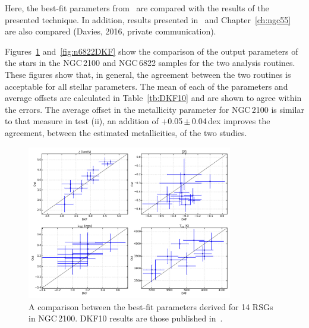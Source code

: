 Here, the best-fit parameters from~\cite{2015ApJ...803...14P} are compared with the results of the presented technique.
In addition, results presented in~\citet{2016arXiv160202702P} and Chapter~\ref{ch:ngc55} are also compared (Davies, 2016, private communication).

Figures~\ref{fig:n2100DKF} and~\ref{fig:n6822DKF} show the comparison of the output parameters of the stars in the NGC\,2100 and NGC\,6822 samples for the two analysis routines.
These figures show that, in general, the agreement between the two routines is acceptable for all stellar parameters.
The mean of each of the parameters and average offsets are calculated in Table~\ref{tb:DKF10} and are shown to agree within the errors.
The average offset in the metallicity parameter for NGC\,2100 is similar to that measure in test (ii), an addition of +0.05\,$\pm$\,0.04\,dex improves the agreement, between the estimated metallicities, of the two studies.


\begin{figure}
 \centering
 \includegraphics[width=0.80\textwidth]{JAnal/NGC2100-par-compare}
 \caption[The best-fit parameter comparison between the results presented in Chapter~\ref{ch:ngc2100} and those of DKF10]{
A comparison between the best-fit parameters derived for 14 RSGs in NGC\,2100.
DKF10 results are those published in~\cite{2016arXiv160202702P}.
\label{fig:n2100DKF}
         }
\end{figure}

